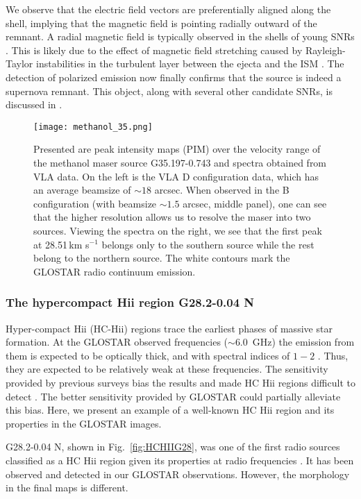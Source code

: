 \documentclass{aa}
\begin{document}
We observe that the electric field vectors are preferentially aligned along the shell, implying that the magnetic field is pointing radially outward of the remnant.  A radial magnetic field is typically observed in the shells of young SNRs \citep{Milne1987}.  This is likely due to the effect of magnetic field stretching caused by Rayleigh-Taylor instabilities in the turbulent layer between the ejecta and the ISM \citep{Jun1996}. The detection of polarized emission now finally confirms that the source is indeed a supernova remnant. This object, along with several other candidate SNRs, is discussed in \cite{Dokara2021}.

\begin{figure*}
        \texttt{[image: methanol\_35.png]}
        \caption{Presented are peak intensity maps (PIM) over the velocity range of the methanol maser source G35.197-0.743 and spectra obtained from VLA data. On the left is the VLA D configuration data, which has an average beamsize of $\sim18$ arcsec. When observed in the B configuration (with beamsize $\sim1.5$ arcsec, middle panel), one can see that the higher resolution allows us to resolve the maser into two sources. Viewing the spectra on the right, we see that the first peak at 28.51\,km s$^{-1}$ belongs only to the southern source while the rest belong to the northern source. The white contours mark the GLOSTAR radio continuum emission. }
        \label{fig:mc_meth}
\end{figure*}

\subsubsection{The hypercompact H{\sc ii} region G28.2-0.04 N}

Hyper-compact H{\sc ii} (HC-H{\sc ii}) regions trace the earliest phases of massive star formation. At the GLOSTAR observed frequencies ($\sim6.0$~GHz) the emission from them is expected to be
optically thick, and with spectral indices of $1-2$ \citep{kurtz2005}. Thus, they are expected to be relatively weak at these frequencies. The sensitivity provided by previous surveys bias the results and made HC H{\sc ii} regions difficult to detect 
\citep{kurtz2005}. The better sensitivity provided by GLOSTAR could partially alleviate this bias. Here, we present an example of a well-known HC H{\sc ii} region and its properties in the GLOSTAR images. 

G28.2-0.04 N, shown in Fig.~\ref{fig:HCHIIG28}, was one of the first radio sources classified as a HC H{\sc ii} region given its properties at radio frequencies \citep[e.g., broad radio recombination lines, rising spectral index, high electron density;][]{sewilo2004}. It has been observed and detected in our GLOSTAR observations. However, the morphology in the final maps is different. 
\end{document}
